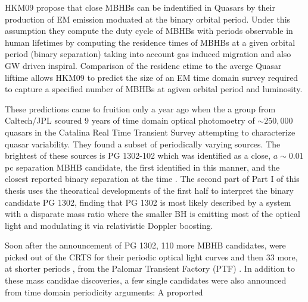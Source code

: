 HKM09 propose that close MBHBs can be indentified in Quasars by their production of EM emission moduated at the binary orbital period. Under this assumption they compute the duty cycle of MBHBs with periods observable in human lifetimes by computing the residence times of MBHBs at a given orbital period (binary separation) taking into account gas induced migration and also GW driven inspiral. Comparison of the residenc etime to the averge Quasar liftime allows HKM09 to predict the size of an EM time domain survey required to capture a specified number of MBHBs at agiven orbital period and luminosity.






These predictions came to fruition only a year ago when the a group from
Caltech/JPL scoured 9 years of time domain optical photomoetry of
$\sim250,000$ quasars in the Catalina Real Time Transient Survey
\citep{CRTS1:Drake:2009, CRTS2:Djorgovski:2010, CRTS3:2011Mahabal,
CRTS4:Djorgovski:2011} attempting to characterize quasar variability. They
found a subset of periodically varying sources. The brightest of these sources
is PG 1302-102 which was identified as a close, $a \sim 0.01$pc separation
MBHB candidate, the first identified in this manner, and the closest reported
binary separation at the time \citep{Graham+2015a}. The second part of Part I
of this thesis uses the theoratical developments of the first half to
interpret the binary candidate PG 1302, finding that PG 1302 is most likely
described by a system with a disparate mass ratio where the smaller BH is
emitting most of the optical light and modulating it via relativistic Doppler
boosting.


Soon after the announcement of PG 1302, 110 more MBHB candidates, were picked
out of the CRTS for their periodic optical light curves \citep{Graham+2015b}
and then 33 more, at shorter periods \citep{Charisi+2016}, from the
Palomar Transient Factory (PTF) \citep{PTF}. In addition to these mass candidae
discoveries, a few single candidates were also announced from time domain periodicity arguments: A proported 


